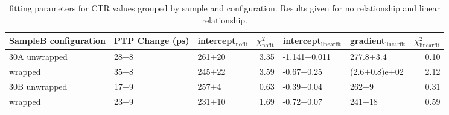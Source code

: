\begin{table}
\caption{\label{tab:ctrfitresults} fitting parameters for CTR values grouped by sample and configuration. Results given for no relationship and linear relationship.}
\begin{tabular}{lllrllr}
\hline
SampleB configuration & PTP Change (ps) & intercept$_\text{nofit}$ &  $\chi^2_\text{nofit}$ & intercept$_\text{linearfit}$ & gradient$_\text{linearfit}$ &  $\chi^2_\text{linearfit}$ \\
\hline
\midrule
30A     unwrapped     &  28$\pm$8 &      261$\pm$20 &                   3.35 &    -1.141$\pm$0.011 &      277.8$\pm$3.4 &                    0.10 \\
        wrapped       &  35$\pm$8 &      245$\pm$22 &                   3.59 &      -0.67$\pm$0.25 &  (2.6$\pm$0.8)e+02 &                    2.12 \\
30B     unwrapped     &  17$\pm$9 &       257$\pm$4 &                   0.63 &      -0.39$\pm$0.04 &          262$\pm$9 &                    0.31 \\
        wrapped       &  23$\pm$9 &      231$\pm$10 &                   1.69 &      -0.72$\pm$0.07 &         241$\pm$18 &                    0.59 \\
\bottomrule
\end{tabular}
\end{table}